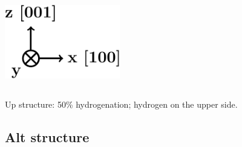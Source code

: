 \documentclass{beamer}
\begin{document}
\begin{frame}
\begin{columns}
\vspace{5mm}

\flushleft
\includegraphics[width=0.9\textwidth]{figs/arrows2.pdf}

\end{columns}

\vspace{-4mm}
\begin{center}
{\Large Up structure:} 50\% hydrogenation; hydrogen on the upper side.
\end{center}

\end{frame}




\subsection{Alt structure}
\end{document}
